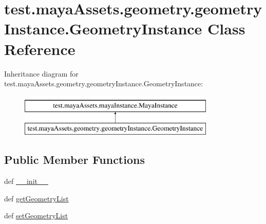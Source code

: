 \hypertarget{classtest_1_1mayaAssets_1_1geometry_1_1geometryInstance_1_1GeometryInstance}{\section{test.\-maya\-Assets.\-geometry.\-geometry\-Instance.\-Geometry\-Instance \-Class \-Reference}
\label{db/d6c/classtest_1_1mayaAssets_1_1geometry_1_1geometryInstance_1_1GeometryInstance}
}
\-Inheritance diagram for test.\-maya\-Assets.\-geometry.\-geometry\-Instance.\-Geometry\-Instance\-:\begin{figure}[H]
\begin{center}
\leavevmode
\includegraphics[height=2.000000cm]{db/d6c/classtest_1_1mayaAssets_1_1geometry_1_1geometryInstance_1_1GeometryInstance}
\end{center}
\end{figure}
\subsection*{\-Public \-Member \-Functions}
\begin{DoxyCompactItemize}
\item 
def \hyperlink{classtest_1_1mayaAssets_1_1geometry_1_1geometryInstance_1_1GeometryInstance_af2f853fa09931f717beaed4b6eabdc73}{\-\_\-\-\_\-init\-\_\-\-\_\-}
\item 
def \hyperlink{classtest_1_1mayaAssets_1_1geometry_1_1geometryInstance_1_1GeometryInstance_a47f08bf9b6a1d364c6dcce084800fddf}{get\-Geometry\-List}
\item 
def \hyperlink{classtest_1_1mayaAssets_1_1geometry_1_1geometryInstance_1_1GeometryInstance_a9d92aa5e10191545b12964bbf4475eea}{set\-Geometry\-List}
\end{DoxyCompactItemize}



